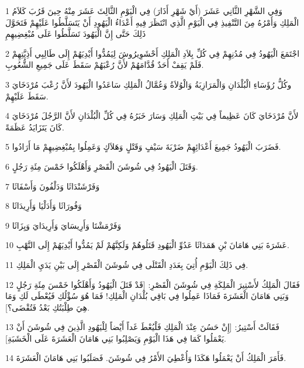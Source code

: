 \par 1 وَفِي الشَّهْرِ الثَّانِي عَشَرَ (أَيْ شَهْرِ أَذَارَ) فِي الْيَوْمِ الثَّالِثَ عَشَرَ مِنْهُ حِينَ قَرُبَ كَلاَمُ الْمَلِكِ وَأَمْرُهُ مِنَ التَّنْفِيذِ فِي الْيَوْمِ الَّذِي انْتَظَرَ فِيهِ أَعْدَاءُ الْيَهُودِ أَنْ يَتَسَلَّطُوا عَلَيْهِمْ فَتَحَوَّلَ ذَلِكَ حَتَّى إِنَّ الْيَهُودَ تَسَلَّطُوا عَلَى مُبْغِضِيهِمِ
\par 2 اجْتَمَعَ الْيَهُودُ فِي مُدُنِهِمْ فِي كُلِّ بِلاَدِ الْمَلِكِ أَحْشَوِيرُوشَ لِيَمُدُّوا أَيْدِيَهُمْ إِلَى طَالِبِي أَذِيَّتِهِمْ فَلَمْ يَقِفْ أَحَدٌ قُدَّامَهُمْ لأَنَّ رُعْبَهُمْ سَقَطَ عَلَى جَمِيعِ الشُّعُوبِ.
\par 3 وكُلُّ رُؤَسَاءِ الْبُلْدَانِ وَالْمَرَازِبَةُ وَالْوُلاَةُ وَعُمَّالُ الْمَلِكِ سَاعَدُوا الْيَهُودَ لأَنَّ رُعْبَ مُرْدَخَايَ سَقَطَ عَلَيْهِمْ.
\par 4 لأَنَّ مُرْدَخَايَ كَانَ عَظِيماً فِي بَيْتِ الْمَلِكِ وَسَارَ خَبَرُهُ فِي كُلِّ الْبُلْدَانِ لأَنَّ الرَّجُلَ مُرْدَخَايَ كَانَ يَتَزَايَدُ عَظَمَةً.
\par 5 فَضَرَبَ الْيَهُودُ جَمِيعَ أَعْدَائِهِمْ ضَرْبَةَ سَيْفٍ وَقَتْلٍ وَهَلاَكٍ وَعَمِلُوا بِمُبْغِضِيهِمْ مَا أَرَادُوا.
\par 6 وَقَتَلَ الْيَهُودُ فِي شُوشَنَ الْقَصْرِ وَأَهْلَكُوا خَمْسَ مِئَةِ رَجُلٍ.
\par 7 وَفَرْشَنْدَاثَا وَدَلْفُونَ وَأَسْفَاثَا
\par 8 وَفُورَاثَا وَأَدَلْيَا وَأَرِيدَاثَا
\par 9 وَفَرْمَشْتَا وَأَرِيسَايَ وَأَرِيدَايَ وَيِزَاثَا
\par 10 عَشَرَةَ بَنِي هَامَانَ بْنِ هَمَدَاثَا عَدُوِّ الْيَهُودِ قَتَلُوهُمْ وَلَكِنَّهُمْ لَمْ يَمُدُّوا أَيْدِيَهُمْ إِلَى النَّهْبِ.
\par 11 فِي ذَلِكَ الْيَوْمِ أُتِيَ بِعَدَدِ الْقَتْلَى فِي شُوشَنَ الْقَصْرِ إِلَى بَيْنِ يَدَيِ الْمَلِكِ.
\par 12 فَقَالَ الْمَلِكُ لأَسْتِيرَ الْمَلِكَةِ فِي شُوشَنَ الْقَصْرِ: [قَدْ قَتَلَ الْيَهُودُ وَأَهْلَكُوا خَمْسَ مِئَةِ رَجُلٍ وَبَنِي هَامَانَ الْعَشَرَةَ فَمَاذَا عَمِلُوا فِي بَاقِي بُلْدَانِ الْمَلِكِ! فَمَا هُوَ سُؤْلُكِ فَيُعْطَى لَكِ وَمَا هِيَ طِلْبَتُكِ بَعْدُ فَتُقْضَى؟].
\par 13 فَقَالَتْ أَسْتِيرُ: [إِنْ حَسُنَ عِنْدَ الْمَلِكِ فَلْيُعْطَ غَداً أَيْضاً لِلْيَهُودِ الَّذِينَ فِي شُوشَنَ أَنْ يَعْمَلُوا كَمَا فِي هَذَا الْيَوْمِ وَيَصْلِبُوا بَنِي هَامَانَ الْعَشَرَةَ عَلَى الْخَشَبَةِ].
\par 14 فَأَمَرَ الْمَلِكُ أَنْ يَعْمَلُوا هَكَذَا وَأُعْطِيَ الأَمْرُ فِي شُوشَنَ. فَصَلَبُوا بَنِي هَامَانَ الْعَشَرَةَ.
